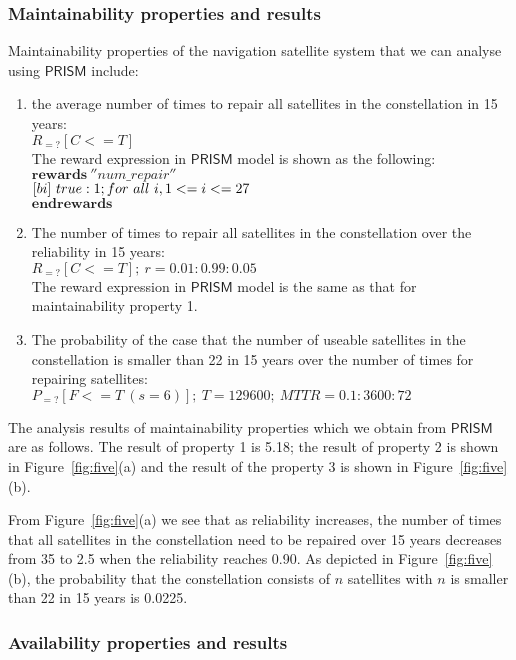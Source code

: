 \documentclass[preprint,12pt]{qrei}
\begin{document}
\subsubsection{Maintainability properties and results}

Maintainability properties of the navigation satellite system that we can analyse using $\mathsf{PRISM}$ include:

\begin{enumerate}
\item the average number of times to repair all satellites in the constellation in 15 years:\\
$R_{=?}[C<=T]$\\
The reward expression in $\mathsf{PRISM}$ model is shown as the following:
$\textbf{rewards}\ ''num\_repair''$\\
$[bi]\ true : 1; \\for\ all\ i, 1<=i<=27$\\
$\textbf{endrewards}$
\item The number of times to repair all satellites in the constellation over the reliability in 15 years:\\
$R_{=?}[C<=T];\ r=0.01:0.99:0.05$\\
The reward expression in $\mathsf{PRISM}$ model is the same as that for maintainability property 1.
\item The probability of the case that the number of useable satellites in the constellation is smaller than 22 in 15 years over the number of times for repairing satellites:\\
$P_{=?}[F<=T\ (s=6)];\ T=129600;\ MTTR=0.1:3600:72$
\end{enumerate}

The analysis results of maintainability properties which we obtain from $\mathsf{PRISM}$ are as follows. The result of property 1 is 5.18; the result of property 2 is shown in Figure~\ref{fig:five}(a) and 
the result of the property 3 is shown in Figure~\ref{fig:five}(b).

From Figure~\ref{fig:five}(a) we see that as reliability increases, the number of times that all satellites in the constellation need to be repaired over 15 years decreases from 35 to 2.5 when the reliability reaches 0.90. As depicted in Figure~\ref{fig:five}(b), the probability that the constellation consists of $n$ satellites with $n$ is smaller than 22 in 15 years is 0.0225.


\subsubsection{Availability properties and results}
\end{document}

